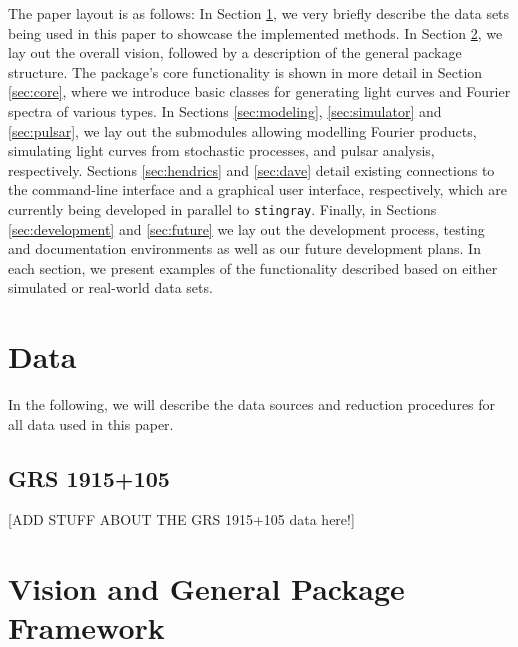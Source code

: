 \documentclass[12pt]{emulateapj}
\newcommand{\stingray}{\texttt{stingray}\xspace}
\begin{document}
The paper layout is as follows: 
In Section \ref{sec:data}, we very briefly describe the data sets being used in this paper to showcase the implemented methods. In Section \ref{sec:vision}, we lay out the overall vision, followed by a description of the general package structure. The package's core functionality is shown in more detail in Section \ref{sec:core}, where we introduce basic classes for generating light curves and Fourier spectra of various types.
In Sections \ref{sec:modeling}, \ref{sec:simulator} and \ref{sec:pulsar}, we lay out the submodules allowing modelling Fourier products, simulating light curves from stochastic processes, and pulsar analysis, respectively.
Sections \ref{sec:hendrics} and \ref{sec:dave} detail existing connections to the command-line interface and a graphical user interface, respectively, which are currently being developed in parallel to \stingray. 
Finally, in Sections \ref{sec:development} and \ref{sec:future} we lay out the development process, testing and documentation environments as well as our future development plans. 
In each section, we present examples of the functionality described based on either simulated or real-world data sets.


\section{Data}
\label{sec:data}
In the following, we will describe the data sources and reduction procedures for all data used in this paper.

\subsection{GRS 1915+105}

[ADD STUFF ABOUT THE GRS 1915+105 data here!]

\section{Vision and General Package Framework}
\label{sec:vision}
\end{document}
